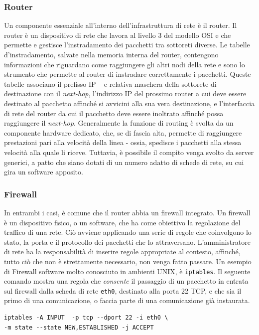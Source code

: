 \subsubsection{Router}
Un componente essenziale all'interno dell'infrastruttura di rete è il router. Il router è un dispositivo di rete che lavora al livello 3 del modello OSI e che permette e gestisce l'instradamento dei pacchetti tra sottoreti diverse.
Le tabelle d'instradamento, salvate nella memoria interna del router, contengono informazioni che riguardano come raggiungere gli altri nodi della rete e sono lo strumento che permette al router di instradare correttamente i pacchetti.
Queste tabelle associano il prefisso IP ~\cite[RFC0791]{RFC0791} e relativa maschera della sottorete di destinazione con il \emph{next-hop}, l'indirizzo IP del prossimo router a cui deve essere destinato al pacchetto affinché si avvicini alla sua vera destinazione, e l'interfaccia di rete del router da cui il pacchetto deve essere inoltrato affinché possa raggiungere il \emph{next-hop}.
Generalmente la funzione di routing è svolta da un componente hardware dedicato, che, se di fascia alta, permette di raggiungere prestazioni pari alla velocità della linea - ossia, spedisce i pacchetti alla stessa velocità alla quale li riceve.
Tuttavia, è possibile il compito venga svolto da server generici, a patto che siano dotati di un numero adatto di schede di rete, su cui gira un software apposito.

\subsubsection{Firewall}
In entrambi i casi, è comune che il router abbia un firewall \cite{RFC2979} integrato.
Un firewall è un dispositivo fisico, o un software, che ha come obiettivo la regolazione del traffico di una rete.
Ciò avviene applicando una serie di regole che coinvolgono lo stato, la porta e il protocollo dei pacchetti che lo attraversano.
L'amministratore di rete ha la responsabilità di inserire regole appropriate al contesto, affinché, tutto ciò che non è strettamente necessario, non venga fatto passare.
Un esempio di Firewall software molto conosciuto in ambienti UNIX, è \lstinline[columns=fixed]{iptables}.
Il seguente comando mostra una regola che \emph{consente} il passaggio di un pacchetto in entrata sul firewall dalla scheda di rete \texttt{eth0}, destinato alla porta 22 TCP, e che sia il primo di una comunicazione, o faccia parte di una comunicazione già instaurata.

\begin{verbatim}
iptables -A INPUT  -p tcp --dport 22 -i eth0 \
-m state --state NEW,ESTABLISHED -j ACCEPT
\end{verbatim}

